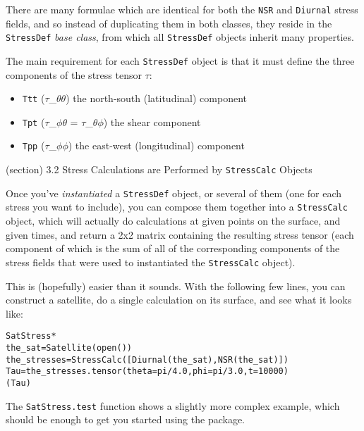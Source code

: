     There are many formulae which are identical for both the \texttt{NSR} 
    and \texttt{Diurnal} stress fields, and so instead of duplicating them 
    in both classes, they reside in the \texttt{StressDef} \textit{base 
    class}, from which all \texttt{StressDef} objects inherit many 
    properties.

    The main requirement for each \texttt{StressDef} object is that it must
    define the three components of the stress tensor \(\tau\):

    \begin{itemize}
    \setlength{\parskip}{0.6ex}
      \item \texttt{Ttt} (\(\tau\)\_\(\theta\)\(\theta\)) the north-south 
        (latitudinal) component

      \item \texttt{Tpt} (\(\tau\)\_\(\phi\)\(\theta\) = 
        \(\tau\)\_\(\theta\)\(\phi\)) the shear component

      \item \texttt{Tpp} (\(\tau\)\_\(\phi\)\(\phi\)) the east-west 
        (longitudinal) component

    \end{itemize}

  (section) 3.2 Stress Calculations are Performed by \texttt{StressCalc} Objects

    Once you've \textit{instantiated} a \texttt{StressDef} object, or 
    several of them (one for each stress you want to include), you can 
    compose them together into a \texttt{StressCalc} object, which will 
    actually do calculations at given points on the surface, and given 
    times, and return a 2x2 matrix containing the resulting stress tensor 
    (each component of which is the sum of all of the corresponding 
    components of the stress fields that were used to instantiated the 
    \texttt{StressCalc} object).

    This is (hopefully) easier than it sounds.  With the following few 
    lines, you can construct a satellite, do a single calculation on its 
    surface, and see what it looks like:

\begin{alltt}
\pysrcprompt{{\textgreater}{\textgreater}{\textgreater} } SatStress  *
\pysrcprompt{{\textgreater}{\textgreater}{\textgreater} }the\_sat = Satellite(open())
\pysrcprompt{{\textgreater}{\textgreater}{\textgreater} }the\_stresses = StressCalc([Diurnal(the\_sat), NSR(the\_sat)])
\pysrcprompt{{\textgreater}{\textgreater}{\textgreater} }Tau = the\_stresses.tensor(theta=pi/4.0, phi=pi/3.0, t=10000)
\pysrcprompt{{\textgreater}{\textgreater}{\textgreater} }(Tau)\end{alltt}
    The \texttt{SatStress.test} function shows a slightly more complex 
    example, which should be enough to get you started using the package.

